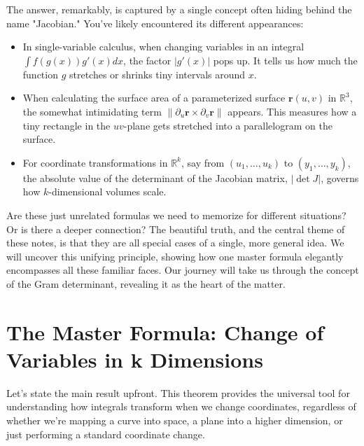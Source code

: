 \documentclass[12pt]{article}
\theoremstyle{definition} %
\theoremstyle{plain} %
\theoremstyle{remark} %
\begin{document}
The answer, remarkably, is captured by a single concept often hiding behind the name "Jacobian." You've likely encountered its different appearances:
\begin{itemize}[leftmargin=2.5em, itemsep=0.5em]
    \item In single-variable calculus, when changing variables in an integral $\int f(g(x)) g'(x) dx$, the factor $|g'(x)|$ pops up. It tells us how much the function $g$ stretches or shrinks tiny intervals around $x$.
    \item When calculating the surface area of a parameterized surface $\mathbf{r}(u,v)$ in $\mathbb{R}^3$, the somewhat intimidating term $\|\partial_u \mathbf{r} \times \partial_v \mathbf{r}\|$ appears. This measures how a tiny rectangle in the $uv$-plane gets stretched into a parallelogram on the surface.
    \item For coordinate transformations in $\mathbb{R}^k$, say from $(u_1, \dots, u_k)$ to $(y_1, \dots, y_k)$, the absolute value of the determinant of the Jacobian matrix, $|\det J|$, governs how $k$-dimensional volumes scale.
\end{itemize}
Are these just unrelated formulas we need to memorize for different situations? Or is there a deeper connection? The beautiful truth, and the central theme of these notes, is that they are all special cases of a single, more general idea. We will uncover this unifying principle, showing how one master formula elegantly encompasses all these familiar faces. Our journey will take us through the concept of the Gram determinant, revealing it as the heart of the matter.

\section{The Master Formula: Change of Variables in k Dimensions}

Let's state the main result upfront. This theorem provides the universal tool for understanding how integrals transform when we change coordinates, regardless of whether we're mapping a curve into space, a plane into a higher dimension, or just performing a standard coordinate change.
\end{document}
